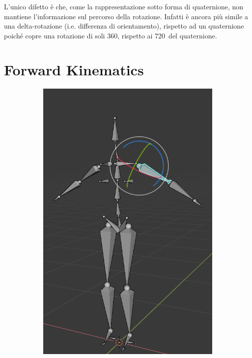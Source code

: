 L'unico difetto è che, come la rappresentazione sotto forma di quaternione, non mantiene l'informazione sul percorso della rotazione. Infatti è ancora più simile a una delta-rotazione (i.e. differenza di orientamento), rispetto ad un quaternione poiché copre una rotazione di soli 360\textdegree, rispetto ai 720\textdegree\ del quaternione. 

\newpage
\section{Forward Kinematics} \label{sectionFK}

\begin{figure}
\centering
\begin{subfigure}{.33\textwidth}
  \centering
  \includegraphics[width=\linewidth]{Figures/armature1}

\end{subfigure}
\end{figure}
